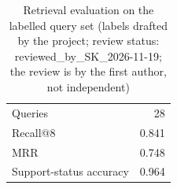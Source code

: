 \begin{table}[t]\centering\caption{Retrieval evaluation on the labelled query set (labels drafted by the project; review status: reviewed\_by\_SK\_2026-11-19; the review is by the first author, not independent)}\label{tab:ret}
\begin{tabular}{lr}\toprule
Queries & 28 \\ Recall@8 & 0.841 \\ MRR & 0.748 \\ Support-status accuracy & 0.964 \\ \bottomrule\end{tabular}\end{table}
